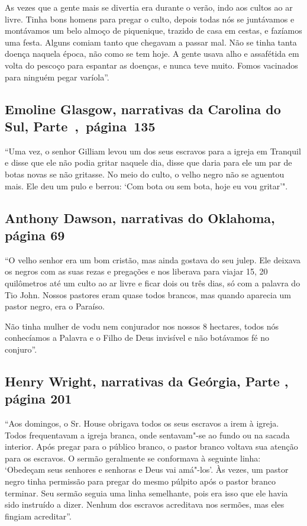 As vezes que a gente mais se divertia era durante o verão, indo aos
cultos ao ar livre. Tinha bons homens para pregar o culto, depois todas
nós se juntávamos e montávamos um belo almoço de piquenique, trazido de
casa em cestas, e fazíamos uma festa. Alguns comiam tanto que chegavam a
passar mal. Não se tinha tanta doença naquela época, não como se tem
hoje. A gente usava alho e assafétida em volta do pescoço para espantar
as doenças, e nunca teve muito. Fomos vacinados para ninguém pegar
varíola''.

\subsection{Emoline Glasgow, narrativas da Carolina do Sul, Parte~,~página~135}
\label{ref107}

``Uma vez, o senhor Gilliam levou um dos seus escravos para a igreja em
Tranquil e disse que ele não podia gritar naquele dia, disse que daria
para ele um par de botas novas se não gritasse. No meio do culto, o
velho negro não se aguentou mais. Ele deu um pulo e berrou: `Com bota ou
sem bota, hoje eu vou gritar'".

\subsection{Anthony Dawson, narrativas do Oklahoma, página 69} \label{ref70}

``O velho senhor era um bom cristão, mas ainda gostava do seu julep. Ele
deixava os negros com as suas rezas e pregações e nos liberava para
viajar 15, 20 quilômetros até um culto ao ar livre e ficar dois ou três
dias, só com a palavra do Tio John. Nossos pastores eram quase todos
brancos, mas quando aparecia um pastor negro, era o Paraíso.

Não tinha mulher de vodu nem conjurador nos nossos 8 hectares, todos nós
conhecíamos a Palavra e o Filho de Deus invisível e não botávamos fé no
conjuro''.

\subsection{Henry Wright, narrativas da Geórgia, Parte , página 201}
\label{ref320}

``Aos domingos, o Sr. House obrigava todos os seus escravos a irem à
igreja. Todos frequentavam a igreja branca, onde sentavam"-se ao fundo ou
na sacada interior. Após pregar para o público branco, o pastor branco
voltava sua atenção para os escravos. O sermão geralmente se conformava
à seguinte linha: `Obedeçam seus senhores e senhoras e Deus vai
amá"-los'. Às vezes, um pastor negro tinha permissão para pregar do mesmo
púlpito após o pastor branco terminar. Seu sermão seguia uma linha
semelhante, pois era isso que ele havia sido instruído a dizer. Nenhum
dos escravos acreditava nos sermões, mas eles fingiam acreditar''.

